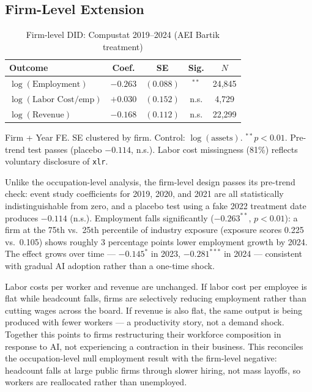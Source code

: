 \documentclass[12pt,a4paper]{article}
\begin{document}
\subsection{Firm-Level Extension}

\begin{table}[H]
\centering
\caption{Firm-level DID: Compustat 2019--2024 (AEI Bartik treatment)}
\label{tab:firm}
\small
\begin{tabular}{lcccc}
\toprule
\textbf{Outcome} & \textbf{Coef.} & \textbf{SE} & \textbf{Sig.} & \textbf{$N$} \\
\midrule
$\log(\text{Employment})$            & $-0.263$ & $(0.088)$ & $^{**}$ & 24,845 \\
$\log(\text{Labor Cost}/\text{emp})$ & $+0.030$ & $(0.152)$ & n.s. & 4,729 \\
$\log(\text{Revenue})$               & $-0.168$ & $(0.112)$ & n.s. & 22,299 \\
\bottomrule
\end{tabular}
\begin{flushleft}
\footnotesize Firm + Year FE. SE clustered by firm. Control: $\log(\text{assets})$. $^{**}p<0.01$. Pre-trend test passes (placebo $-0.114$, n.s.). Labor cost missingness (81\%) reflects voluntary disclosure of \texttt{xlr}.
\end{flushleft}
\end{table}

Unlike the occupation-level analysis, the firm-level design passes its pre-trend check: event study coefficients for 2019, 2020, and 2021 are all statistically indistinguishable from zero, and a placebo test using a fake 2022 treatment date produces $-0.114$ (n.s.). Employment falls significantly ($-0.263^{**}$, $p<0.01$): a firm at the 75th vs.\ 25th percentile of industry exposure (exposure scores 0.225 vs.\ 0.105) shows roughly 3 percentage points lower employment growth by 2024. The effect grows over time — $-0.145^{*}$ in 2023, $-0.281^{***}$ in 2024 — consistent with gradual AI adoption rather than a one-time shock.

Labor costs per worker and revenue are unchanged. If labor cost per employee is flat while headcount falls, firms are selectively reducing employment rather than cutting wages across the board. If revenue is also flat, the same output is being produced with fewer workers — a productivity story, not a demand shock. Together this points to firms restructuring their workforce composition in response to AI, not experiencing a contraction in their business. This reconciles the occupation-level null employment result with the firm-level negative: headcount falls at large public firms through slower hiring, not mass layoffs, so workers are reallocated rather than unemployed.
\end{document}
